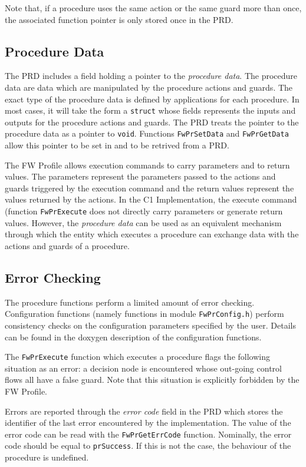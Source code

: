 \documentclass[a4paper,10pt]{article}
\begin{document}
Note that, if a procedure uses the same action or the same guard more than once, the associated function 
pointer is only stored once in the PRD. 

\subsection{Procedure Data}\label{sec:prData}
The PRD includes a field holding a pointer to the \emph{procedure data}. The procedure data are data 
which are manipulated by the procedure actions and guards. The exact type of the procedure data is 
defined by applications for each procedure. In most cases, it will take the form a \texttt{struct} whose 
fields represents the inputs and outputs for the procedure actions and guards. The PRD treats the pointer 
to the procedure data as a pointer to \texttt{void}. Functions \texttt{FwPrSetData} and \texttt{FwPrGetData} 
allow this pointer to be set in and to be retrived from a PRD.

The FW Profile allows execution commands to carry parameters and to return values. The parameters represent 
the parameters passed to the actions and guards triggered by the execution command and the return values represent the 
values returned by the actions. In the C1 Implementation, the execute command (function \texttt{FwPrExecute} 
does not directly carry parameters or generate return values. However, the \emph{procedure data} 
can be used as an equivalent mechanism through which the entity which executes a procedure can exchange data with the 
actions and guards of a procedure.

\subsection{Error Checking}\label{sec:prErrorChecking}
The procedure functions perform a limited amount of error checking. Configuration functions (namely functions 
in module \texttt{FwPrConfig.h}) perform consistency checks on the configuration parameters specified by the user. 
Details can be found in the doxygen description of the configuration functions. 

The \texttt{FwPrExecute} function which executes a procedure flags the following situation as an error:
a decision node is encountered whose out-going control flows all have a false guard.
Note that this situation is explicitly forbidden by the FW Profile.

Errors are reported through the \emph{error code} field in the PRD which stores the identifier of the last 
error encountered by the implementation. The value of the error code can be read with the \texttt{FwPrGetErrCode} 
function. Nominally, the error code should be equal to \texttt{prSuccess}. If this is not the case, the behaviour 
of the procedure is undefined.
\end{document}
